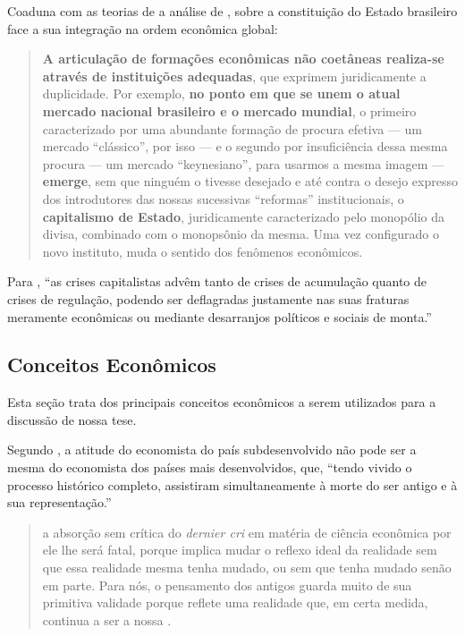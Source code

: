 \documentclass[]{article}
\begin{document}
Coaduna com as teorias de  a análise de
, sobre a constituição
do Estado brasileiro face a sua integração na ordem econômica global:

\begin{quote}
\textbf{A articulação de formações econômicas não coetâneas realiza-se
através de instituições adequadas}, que exprimem juridicamente a
duplicidade. Por exemplo, \textbf{no ponto em que se unem o atual
mercado nacional brasileiro e o mercado mundial}, o primeiro
caracterizado por uma abundante formação de procura efetiva --- um
mercado ``clássico'', por isso --- e o segundo por insuficiência dessa
mesma procura --- um mercado ``keynesiano'', para usarmos a mesma imagem
--- \textbf{emerge}, sem que ninguém o tivesse desejado e até contra o
desejo expresso dos introdutores das nossas sucessivas ``reformas''
institucionais, o \textbf{capitalismo de Estado}, juridicamente
caracterizado pelo monopólio da divisa, combinado com o monopsônio da
mesma. Uma vez configurado o novo instituto, muda o sentido dos
fenômenos econômicos.
\end{quote}

Para , ``as crises capitalistas advêm tanto
de crises de acumulação quanto de crises de regulação, podendo ser
deflagradas justamente nas suas fraturas meramente econômicas ou
mediante desarranjos políticos e sociais de monta.''

\subsection{Conceitos Econômicos}\label{sec:conceitos}

Esta seção trata dos principais conceitos econômicos a serem utilizados
para a discussão de nossa tese.

Segundo , a atitude do economista do país
subdesenvolvido não pode ser a mesma do economista dos países mais
desenvolvidos, que, ``tendo vivido o processo histórico completo,
assistiram simultaneamente à morte do ser antigo e à sua
representação.''

\begin{quote}
a absorção sem crítica do \emph{dernier cri} em matéria de ciência
econômica por ele lhe será fatal, porque implica mudar o reflexo ideal
da realidade sem que essa realidade mesma tenha mudado, ou sem que tenha
mudado senão em parte. Para nós, o pensamento dos antigos guarda muito
de sua primitiva validade porque reflete uma realidade que, em certa
medida, continua a ser a nossa \cite[p.~206-207]{rangel1956}.
\end{quote}
\end{document}
